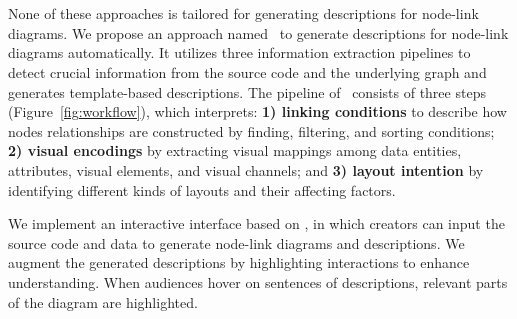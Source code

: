 \section{\ApproachName}


None of these approaches is tailored for generating descriptions for node-link diagrams. 
We propose an approach named \ApproachName~to generate descriptions for node-link diagrams automatically.
It utilizes three information extraction pipelines to detect crucial information from the source code and the underlying graph and generates template-based descriptions.
The pipeline of \ApproachName~consists of three steps (Figure~\ref{fig:workflow}), which interprets:
\textbf{1) linking conditions} to describe how nodes relationships are constructed by finding, filtering, and sorting conditions;
\textbf{2) visual encodings} by extracting visual mappings among data entities, attributes, visual elements, and visual channels; and
\textbf{3) layout intention} by identifying different kinds of layouts and their affecting factors.

We implement an interactive interface based on \ApproachName, in which creators can input the source code and data to generate node-link diagrams and descriptions.
We augment the generated descriptions by highlighting interactions to enhance understanding.
When audiences hover on sentences of descriptions, relevant parts of the diagram are highlighted.

